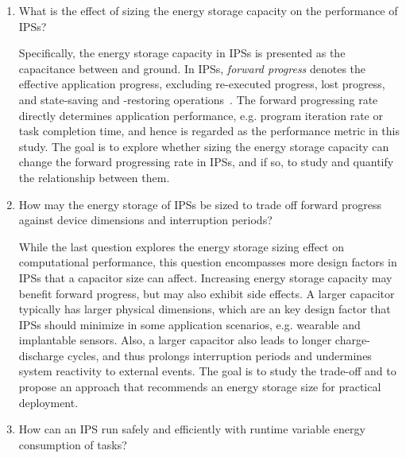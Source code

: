 \begin{enumerate}

\item What is the effect of sizing the energy storage capacity on the performance of IPSs? 

Specifically, the energy storage capacity in IPSs is presented as the capacitance between  and ground. 
In IPSs, \textit{forward progress} denotes the effective application progress, excluding re-executed progress, lost progress, and state-saving and -restoring operations~\cite{7478428}.
The forward progressing rate directly determines application performance, e.g. program iteration rate or task completion time, and hence is regarded as the performance metric in this study. 
The goal is to explore whether sizing the energy storage capacity can change the forward progressing rate in IPSs, and if so, to study and quantify the relationship between them. 

\item How may the energy storage of IPSs be sized to trade off forward progress against device dimensions and interruption periods?

While the last question explores the energy storage sizing effect on computational performance, this question encompasses more design factors in IPSs that a capacitor size can affect. 
Increasing energy storage capacity may benefit forward progress, but may also exhibit side effects. 
A larger capacitor typically has larger physical dimensions, which are an key design factor that IPSs should minimize in some application scenarios, e.g. wearable and implantable sensors. 
Also, a larger capacitor also leads to longer charge-discharge cycles, and thus prolongs interruption periods and undermines system reactivity to external events. 
The goal is to study the trade-off and to propose an approach that recommends an energy storage size for practical deployment.

\item How can an IPS run safely and efficiently with runtime variable energy consumption of tasks?


\end{enumerate}
